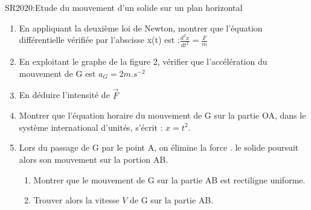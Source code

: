 \documentclass[12pt]{article}
\begin{document}
\begin{Box2}{SR2020:Etude du mouvement d’un solide sur un plan horizontal }
\begin{enumerate}
  \item En appliquant la deuxième loi de Newton, montrer que
    l’équation différentielle vérifiée par l’abscisse x(t) est :$\frac{d^2x}{dt^2} = \frac{F}{m}$
  \item En exploitant le graphe de la figure 2, vérifier que l’accélération
    du mouvement de G est $a_G = 2 m.s^{-2}$
  \item En déduire l’intensité de $\vec{F}$
  \item Montrer que l’équation horaire du mouvement de G sur la partie OA, dans le système
international d’unités, s’écrit : $x = t^2$.
\item Lors du passage de G par le point A, on élimine la force . le solide poursuit alors son
mouvement sur la portion AB.
\begin{enumerate}
  \item Montrer que le mouvement de G sur la partie AB est rectiligne uniforme.
  \item Trouver alors la vitesse $V$ de G sur la partie AB.

\end{enumerate}
\end{enumerate}


\end{Box2}
\end{document}
